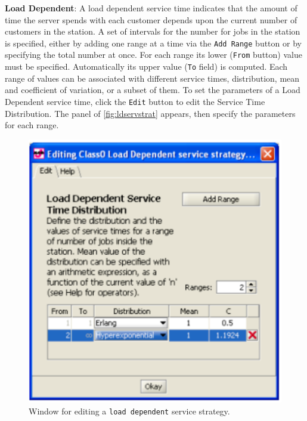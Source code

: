 \begin{itemize*}
\item \textbf{Load Dependent}: A load dependent service time
indicates that the amount of time the server spends with each
customer depends upon the current number of customers in the
station. A set of intervals for the number for jobs in the station
is specified, either by adding one range at a time via the
\texttt{Add Range} button or by specifying the total number at
once. For each range its lower (\texttt{From} button) value must
be specified. Automatically its upper value (\texttt{To} field) is
computed. Each range of values can be associated with different
service times, distribution, mean and coefficient of variation, or
a subset of them. To set the parameters of a Load Dependent
service time, click the \texttt{Edit} button to edit the Service
Time Distribution. The panel of \autoref{fig:ldservstrat}
appears, then specify the parameters for each range.\\
\begin{figure}[htb]
    \begin{center}
        \includegraphics[scale=.5]{img/jsimg/8.18.eps}
    \end{center}
    \caption{Window for editing a \texttt{load dependent} service strategy.}
    \label{fig:ldservstrat}
\end{figure}

\end{itemize*}
